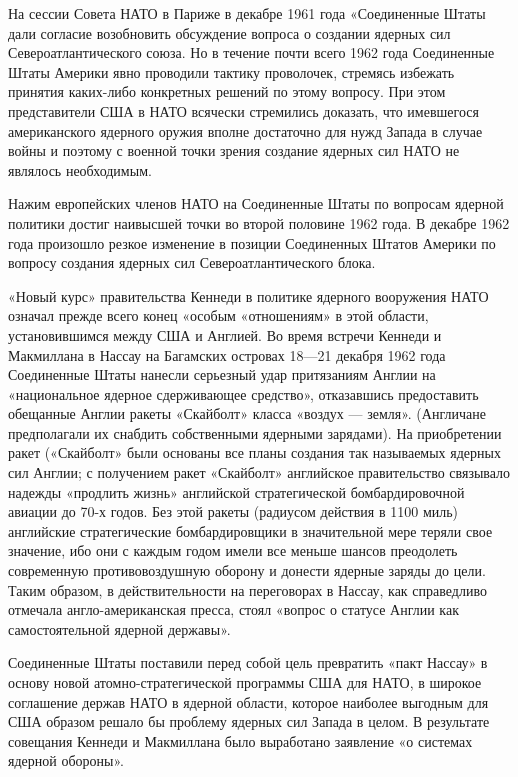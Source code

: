 \documentclass[12pt, a4paper, openany]{book}
\begin{document}
	На сессии Совета НАТО в Париже в декабре 1961 года «Соединенные Штаты дали согласие возобновить обсуждение вопроса о создании ядерных сил Североатлантического союза. Но в течение почти всего 1962 года Соединенные Штаты Америки явно проводили тактику проволочек, стремясь избежать принятия каких-либо конкретных решений по этому вопросу. При этом представители США в НАТО всячески стремились доказать, что имевшегося американского ядерного оружия вполне достаточно для нужд Запада в случае войны и поэтому с военной точки зрения создание ядерных сил НАТО не являлось необходимым.
	
	Нажим европейских членов НАТО на Соединенные Штаты по вопросам ядерной политики достиг наивысшей точки во второй половине 1962 года. В декабре 1962 года произошло резкое изменение в позиции Соединенных Штатов Америки по вопросу создания ядерных сил Североатлантического блока.
	
	«Новый курс» правительства Кеннеди в политике ядерного вооружения НАТО означал прежде всего конец «особым «отношениям» в этой области, установившимся между США и Англией. Во время встречи Кеннеди и Макмиллана в Нассау на Багамских островах 18—21 декабря 1962 года Соединенные Штаты нанесли серьезный удар притязаниям Англии на «национальное ядерное сдерживающее средство», отказавшись предоставить обещанные Англии ракеты «Скайболт» класса «воздух — земля». (Англичане предполагали их снабдить собственными ядерными зарядами). На приобретении ракет («Скайболт» были основаны все планы создания так называемых ядерных сил Англии; с получением ракет «Скайболт» английское правительство связывало надежды «продлить жизнь» английской стратегической бомбардировочной авиации до 70-х годов. Без этой ракеты (радиусом действия в 1100 миль) английские стратегические бомбардировщики в значительной мере теряли свое значение, ибо они с каждым годом имели все меньше шансов преодолеть современную противовоздушную оборону и донести ядерные заряды до цели. Таким образом, в действительности на переговорах в Нассау, как справедливо отмечала англо-американская пресса, стоял «вопрос о статусе Англии как самостоятельной ядерной державы».
	
	Соединенные Штаты поставили перед собой цель превратить «пакт Нассау» в основу новой атомно-стратегической программы США для НАТО, в широкое соглашение держав НАТО в ядерной области, которое наиболее выгодным для США образом решало бы проблему ядерных сил Запада в целом. В результате совещания Кеннеди и Макмиллана было выработано заявление «о системах ядерной обороны».
	
\end{document}
